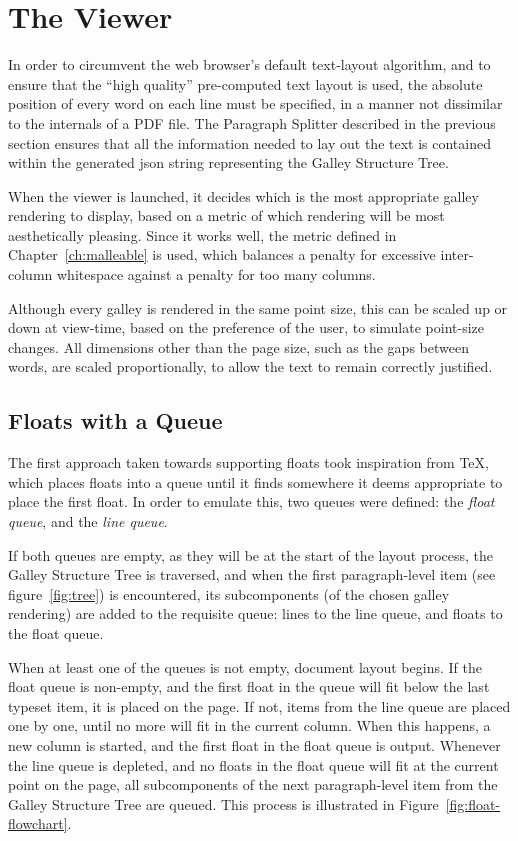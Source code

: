 \section{The Viewer}
\label{sec:viewer}

In order to circumvent the web browser's default text-layout algorithm, and to ensure that the ``high quality'' pre-computed text layout is used, the absolute position of every word on each line must be specified, in a manner not dissimilar to the internals of a PDF file. The Paragraph Splitter described in the previous section ensures that all the information needed to lay out the text is contained within the generated \gls{json} string representing the Galley Structure Tree.


When the viewer is launched, it decides which is the most appropriate galley rendering to display, based on a metric of which rendering will be most aesthetically pleasing. Since it works well, the metric defined in Chapter~\ref{ch:malleable} is used, which balances a penalty for excessive inter-column whitespace against a penalty for too many columns.

Although every galley is rendered in the same point size, this can be scaled up or down at view-time, based on the preference of the user, to simulate point-size changes. All dimensions other than the page size, such as the gaps between words, are scaled proportionally, to allow the text to remain correctly justified.




\subsection{Floats with a Queue}
\label{sec:floatqueue}
The first approach taken towards supporting floats took inspiration from \TeX, which places floats into a queue until it finds somewhere it deems appropriate to place the first float.\hspace{0pt}\cite{Plass1981, Knuth1984} In order to emulate this, two queues were defined: the \emph{float queue}, and the \emph{line queue}.


If both queues are empty, as they will be at the start of the layout process, the Galley Structure Tree is traversed, and when the first paragraph-level item (see figure~\ref{fig:tree}) is encountered, its subcomponents (of the chosen galley rendering) are added to the requisite queue: lines to the line queue, and floats to the float queue.

When at least one of the queues is not empty, document layout begins. If the float queue is non-empty, and the first float in the queue will fit below the last typeset item, it is placed on the page. If not, items from the line queue are placed one by one, until no more will fit in the current column. When this happens, a new column is started, and the first float in the float queue is output. Whenever the line queue is depleted, and no floats in the float queue will fit at the current point on the page, all subcomponents of the next paragraph-level item from the Galley Structure Tree are queued. This process is illustrated in Figure~\ref{fig:float-flowchart}.

